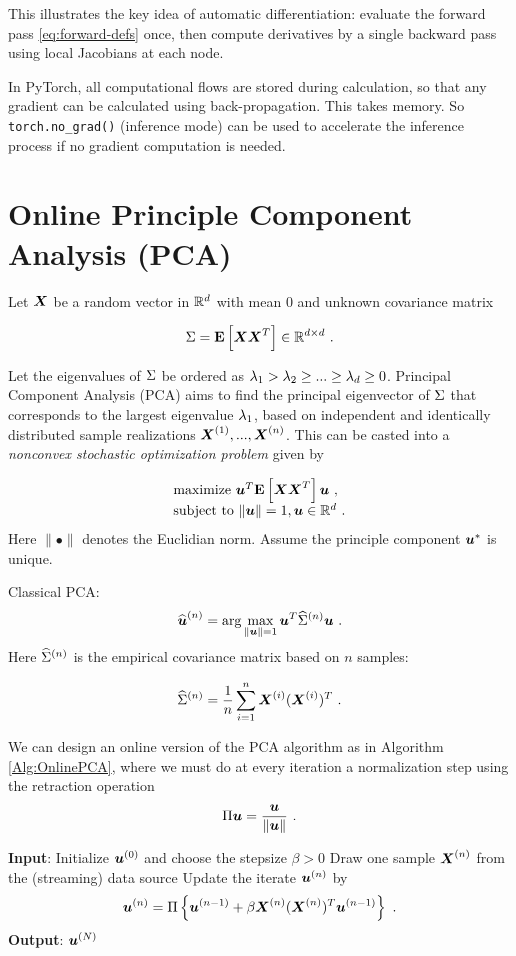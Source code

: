 This illustrates the key idea of automatic differentiation: evaluate the forward pass
\eqref{eq:forward-defs} once, then compute derivatives by a single backward pass using
local Jacobians at each node.

In PyTorch, all computational flows are stored during calculation, so that any gradient can be calculated using back-propagation. This takes memory. So \verb#torch.no_grad()# (inference mode) can be used to accelerate the inference process if no gradient computation is needed.


\section{Online Principle Component Analysis (PCA)}

Let $\boldsymbol{X}$ be a random vector in $\mathbb R^d$ with mean $0$ and unknown covariance matrix

$$\Sigma=\mathbf E\left[\boldsymbol{X}\boldsymbol{X}^T\right]\in \mathbb R^{d\times d} \ .$$

Let the eigenvalues of $\Sigma$ be ordered as $\lambda_1>\lambda_2\geq ...\geq \lambda_d\geq 0$. Principal Component Analysis (PCA) aims to find the principal eigenvector of $\Sigma$ that corresponds to the largest
eigenvalue $\lambda_1$, based on independent and identically distributed sample realizations
$\boldsymbol{X}^{(1)},..., \boldsymbol{X}^{(n)}$. This can be casted into a \textit{nonconvex stochastic optimization problem} given by

$$\begin{array}{l}
\text{maximize } \boldsymbol{u}^T \mathbf E\left[\boldsymbol{X}\boldsymbol{X}^T\right]\boldsymbol{u} \ ,
\\
\text{subject to } \|\boldsymbol{u}\|=1, \boldsymbol{u}\in \mathbb R^d \ .
\end{array}$$
Here $\|\bullet\|$ denotes the Euclidian norm. 
Assume the principle component $\boldsymbol{u}^*$ is unique. 

Classical PCA: 
$$\widehat{\boldsymbol{u}}^{(n)}=\arg\max\limits_{\|\boldsymbol{u}\|=1}\boldsymbol{u}^T \widehat{\Sigma}^{(n)}\boldsymbol{u} \ .$$
Here $\widehat{\Sigma}^{(n)}$ is the empirical covariance matrix based on $n$ samples:

$$\widehat{\Sigma}^{(n)}=\dfrac{1}{n}\sum\limits_{i=1}^n \boldsymbol{X}^{(i)}(\boldsymbol{X}^{(i)})^T \ .$$

We can design an online version of the PCA algorithm as in Algorithm \ref{Alg:OnlinePCA}, where we must do at every iteration a normalization step using the retraction operation 
$$\Pi \boldu=\dfrac{\boldu}{\|\boldu\|} \ .$$

\begin{algorithm}[H]
\caption{Online PCA Algorithm}
\label{Alg:OnlinePCA}
\begin{algorithmic}[1]
\STATE \textbf{Input}: Initialize $\boldsymbol{u}^{(0)}$ and choose the stepsize $\beta>0$ 
    \STATE Draw one sample $\boldsymbol{X}^{(n)}$ from the (streaming) data source
    \STATE Update the iterate $\boldsymbol{u}^{(n)}$ by
    $$\boldsymbol{u}^{(n)}=\Pi\left\{\boldsymbol{u}^{(n-1)}+\beta \boldsymbol{X}^{(n)}(\boldsymbol{X}^{(n)})^T\boldsymbol{u}^{(n-1)}\right\} \ .$$
\ENDFOR
\STATE \textbf{Output}: $\boldsymbol{u}^{(N)}$
\end{algorithmic}
\end{algorithm}

